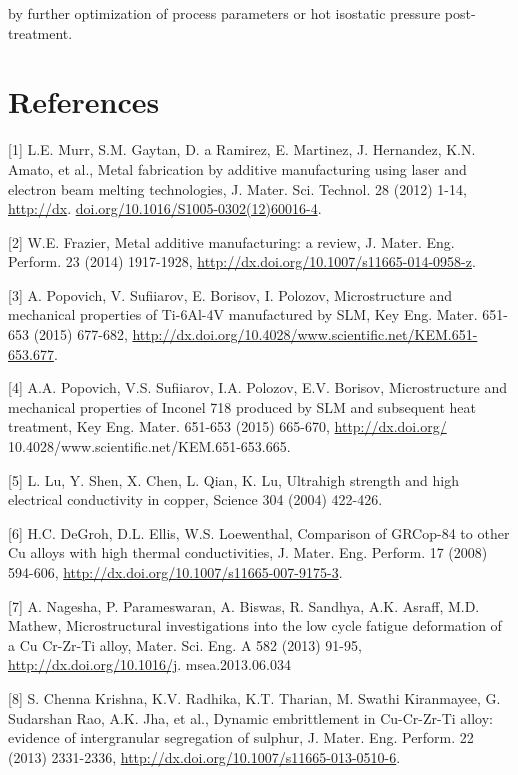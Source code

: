 \documentclass[10pt]{article}
\begin{document}
by further optimization of process parameters or hot isostatic pressure post-treatment.

\section*{References}
[1] L.E. Murr, S.M. Gaytan, D. a Ramirez, E. Martinez, J. Hernandez, K.N. Amato, et al., Metal fabrication by additive manufacturing using laser and electron beam melting technologies, J. Mater. Sci. Technol. 28 (2012) 1-14, \href{http://dx}{http://dx}. \href{http://doi.org/10.1016/S1005-0302(12)60016-4}{doi.org/10.1016/S1005-0302(12)60016-4}.

[2] W.E. Frazier, Metal additive manufacturing: a review, J. Mater. Eng. Perform. 23 (2014) 1917-1928, \href{http://dx.doi.org/10.1007/s11665-014-0958-z}{http://dx.doi.org/10.1007/s11665-014-0958-z}.

[3] A. Popovich, V. Sufiiarov, E. Borisov, I. Polozov, Microstructure and mechanical properties of Ti-6Al-4V manufactured by SLM, Key Eng. Mater. 651-653 (2015) 677-682, \href{http://dx.doi.org/10.4028/www.scientific.net/KEM.651-653.677}{http://dx.doi.org/10.4028/www.scientific.net/KEM.651-653.677}.

[4] A.A. Popovich, V.S. Sufiiarov, I.A. Polozov, E.V. Borisov, Microstructure and mechanical properties of Inconel 718 produced by SLM and subsequent heat treatment, Key Eng. Mater. 651-653 (2015) 665-670, \href{http://dx.doi.org/}{http://dx.doi.org/} 10.4028/www.scientific.net/KEM.651-653.665.

[5] L. Lu, Y. Shen, X. Chen, L. Qian, K. Lu, Ultrahigh strength and high electrical conductivity in copper, Science 304 (2004) 422-426.

[6] H.C. DeGroh, D.L. Ellis, W.S. Loewenthal, Comparison of GRCop-84 to other Cu alloys with high thermal conductivities, J. Mater. Eng. Perform. 17 (2008) 594-606, \href{http://dx.doi.org/10.1007/s11665-007-9175-3}{http://dx.doi.org/10.1007/s11665-007-9175-3}.

[7] A. Nagesha, P. Parameswaran, A. Biswas, R. Sandhya, A.K. Asraff, M.D. Mathew, Microstructural investigations into the low cycle fatigue deformation of a $\mathrm{Cu}$ Cr-Zr-Ti alloy, Mater. Sci. Eng. A 582 (2013) 91-95, \href{http://dx.doi.org/10.1016/j}{http://dx.doi.org/10.1016/j}. msea.2013.06.034

[8] S. Chenna Krishna, K.V. Radhika, K.T. Tharian, M. Swathi Kiranmayee, G. Sudarshan Rao, A.K. Jha, et al., Dynamic embrittlement in Cu-Cr-Zr-Ti alloy: evidence of intergranular segregation of sulphur, J. Mater. Eng. Perform. 22 (2013) 2331-2336, \href{http://dx.doi.org/10.1007/s11665-013-0510-6}{http://dx.doi.org/10.1007/s11665-013-0510-6}.
\end{document}
